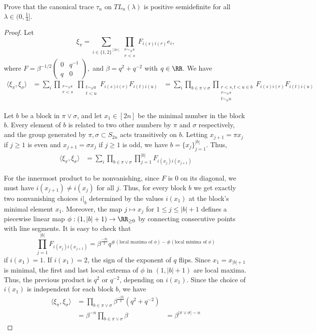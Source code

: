 \documentclass{article}
\begin{document}
 Prove that the canonical trace $\tau_n$ on $TL_n(\lambda)$ is positive semidefinite for all $\lambda \in (0, \frac{1}{4}]$.
  \begin{proof}
    Let $$\xi_\pi = \sum_{i \in \{1,2\}^{[2n]}} \prod_{\substack{r \sim_\pi s\\ r< s}} F_{i(s)i(r)} e_i,$$
      where $F = \beta^{-1/2} \begin{pmatrix} 0 & q^{-1} \\ q & 0 \end{pmatrix},$ and $\beta = q^2 + q^{-2}$ with $q \in \RR$.   We have
      \begin{align*}
        \langle \xi_\pi, \xi_\sigma \rangle & = \sum_i \prod_{\substack{r \sim_\pi s\\ r < s}} \prod_{\substack{t \sim_\sigma u\\ t < u}} F_{i(s)i(r)} F_{i(t) i(u)} 
        & = \sum_i \prod_{b \in \pi \vee \sigma} \prod_{\substack{r<s, t<u \in b\\ r \sim_\pi s \\ t \sim_\sigma u }} F_{i(s)i(r)} F_{i(t) i(u)} 
      \end{align*}

      Let $b$ be a block in $\pi \vee \sigma$, and let $x_1 \in [2n]$ be the minimal number in the block $b$.  Every element of $b$ is related to two other numbers by $\pi$ and $\sigma$ respectively, and the group generated by $\pi, \sigma \subset S_{2n}$ acts transitively on $b$.  Letting $x_{j+1} = \pi x_{j}$ if $j \ge 1$ is even and $x_{j+1} = \sigma x_j$ if $j \ge 1$ is odd, we have $b = \{x_j\}_{j = 1}^{|b|}$.  Thus,
      \begin{align*}
        \langle \xi_\pi, \xi_\sigma \rangle &  = \sum_i \prod_{b \in \pi \vee \sigma} \prod_{j = 1}^{|b|} F_{i(x_j)i(x_{j+1})}  
      \end{align*}

      For the innermost product to be nonvanishing, since $F$ is $0$ on its diagonal, we must have $i(x_{j+1}) \neq i(x_{j})$ for all $j$.  Thus, for every block $b$ we get exactly two nonvanishing choices $i|_b$ determined by the values $i(x_1)$ at the block's minimal element $x_1$.  Moreover, the map $j \mapsto x_j$ for $1 \le j \le |b| + 1$ defines a piecewise linear map $\phi: (1, |b| +1) \to \RR_{\ge 0}$ by connecting consecutive points with line segments.  It is easy to check that
      $$ \prod_{j = 1}^{|b|} F_{i(x_j)i(x_{j+1})}   = \beta^{\frac{-|b|}{2}} q^{\# (\text{local maxima of } \phi)- \# (\text{local minima of } \phi)} $$
      if $i(x_1) = 1$.  If $i(x_1) = 2$, the sign of the exponent of $q$ flips.   Since $x_1 = x_{|b| + 1}$ is minimal, the first and last local extrema of $\phi$ in $(1, |b| + 1)$ are local maxima.  Thus, the previous product is $q^2$ or $q^{-2}$, depending on $i(x_1)$.  Since the choice of $i(x_1)$ is independent for each block $b$, we have
\begin{align*}
  \langle \xi_\pi, \xi_\sigma \rangle &  = \prod_{b \in \pi \vee \sigma} \beta^{\frac{-|b|}{2}} (q^2 + q^{-2})   \\
  & = \beta^{-n} \prod_{b \in \pi \vee \sigma} \beta
  & = \beta^{|\pi \vee \sigma| - n}
\end{align*}


\end{proof}
\end{document}

